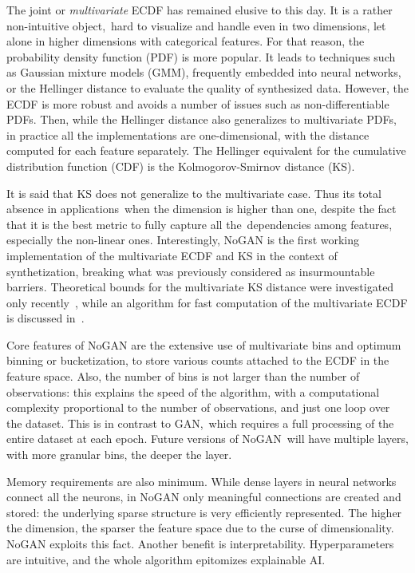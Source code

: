 \documentclass[oneside,10pt]{book}
\begin{document}
The joint or {\em multivariate} ECDF has remained elusive to this day. It is a rather non-intuitive object,~hard to visualize and handle even in two dimensions, let alone in higher dimensions with categorical features. For that reason, the probability density function (PDF) is more popular. It leads to techniques such as
 \textcolor{index}{Gaussian mixture models} (GMM), frequently embedded into neural networks,
  or the \textcolor{index}{Hellinger distance} to evaluate the quality of synthesized data. However, the ECDF is more robust and avoids a number of issues such as non-differentiable PDFs. Then, while the Hellinger distance also generalizes to multivariate PDFs, in practice all the implementations are one-dimensional, with the distance computed for each feature separately.  The Hellinger equivalent for the cumulative distribution function (CDF) is the 
\textcolor{index}{Kolmogorov-Smirnov distance} (KS). 

It is said that KS does not generalize to the multivariate case. Thus its 
 total absence in applications~when the dimension is higher than one, despite the fact that it is the best metric to fully capture all 
the~dependencies among features, especially the non-linear ones. Interestingly, NoGAN is the first   
 working implementation of the multivariate ECDF and KS in the context of synthetization, breaking what was previously considered as insurmountable barriers.
 Theoretical bounds for the multivariate KS distance were investigated only recently~\cite{gtepouc21}, while an algorithm 
 for fast computation of the multivariate ECDF is discussed in~\cite{putrider22}.


Core features of NoGAN are the extensive use of multivariate bins and 
\textcolor{index}{optimum binning} or bucketization, to store various counts
 attached to the ECDF in the feature space. Also, the number of bins is not larger than the number of observations: this explains
  the speed of the algorithm, with a computational complexity proportional to the number of observations, and just one loop over the dataset.
 This is in contrast to GAN,~which requires a full processing of the entire dataset at each \textcolor{index}{epoch}. Future versions of NoGAN~will have multiple layers,
 with more granular bins, the deeper the layer. 

Memory requirements are also minimum. While dense layers in
 neural networks connect all the neurons, in NoGAN only meaningful connections are created and stored: the underlying sparse structure is very efficiently 
 represented. The higher the dimension, the sparser the feature space due to the curse of dimensionality. NoGAN exploits this fact. Another benefit is interpretability. Hyperparameters are intuitive, and the whole algorithm epitomizes \textcolor{index}{explainable AI}.
\end{document}
